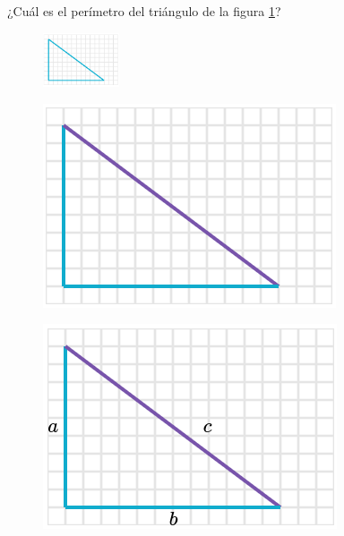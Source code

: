 ¿Cuál es el perímetro del triángulo de la figura \ref{fig:peri_rect_02}?

\begin{figure}[H]
    \centering
    \includegraphics[width=0.2\textwidth]{../images/peri_rect_02.png}
    \caption{}
    \label{fig:peri_rect_02}
\end{figure}
\begin{solutionbox}{16cm}
    \begin{minipage}{0.3\textwidth}
        \begin{figure}[H]
            \centering
            \includegraphics[width=0.6\linewidth]{../images/peri_rect_02a.png}
            \caption{}
            \label{fig:peri_rect_02a}
        \end{figure}
        \begin{figure}[H]
            \centering
            \includegraphics[width=0.6\linewidth]{../images/peri_rect_02b.png}
            \caption{}
            \label{fig:peri_rect_02b}
        \end{figure}

\end{minipage}
\end{solutionbox}
